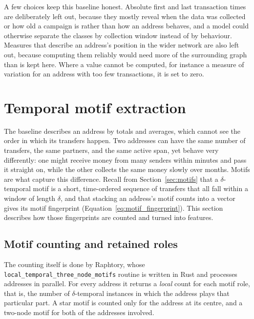 \documentclass{thesisclass}
\begin{document}
A few choices keep this baseline honest. Absolute first and last transaction
times are deliberately left out, because they mostly reveal when the data was
collected or how old a campaign is rather than how an address behaves, and a
model could otherwise separate the classes by collection window instead of by
behaviour. Measures that describe an address's position in the wider network are also left
out, because computing them reliably would need more of the surrounding graph
than is kept here. Where a value cannot be computed, for instance a measure of
variation for an address with too few transactions, it is set to zero.

\section{Temporal motif extraction}
\label{sec:motif_extraction}

The baseline describes an address by totals and averages, which cannot see the
order in which its transfers happen. Two addresses can have the same number of
transfers, the same partners, and the same active span, yet behave very
differently: one might receive money from many senders within minutes and pass
it straight on, while the other collects the same money slowly over months.
Motifs are what capture this difference. Recall from Section~\ref{sec:motifs}
that a $\delta$-temporal motif is a short, time-ordered sequence of transfers
that all fall within a window of length $\delta$, and that stacking an address's
motif counts into a vector gives its motif fingerprint
(Equation~\ref{eq:motif_fingerprint}). This section describes how those
fingerprints are counted and turned into features.

\subsection{Motif counting and retained roles}

The counting itself is done by Raphtory, whose
\texttt{local\_temporal\_three\_node\_motifs} routine is written in Rust and
processes addresses in parallel. For every address it returns a \emph{local}
count for each motif role, that is, the number of $\delta$-temporal instances in
which the address plays that particular part. A star motif is counted only for
the address at its centre, and a two-node motif for both of the addresses
involved.
\end{document}
